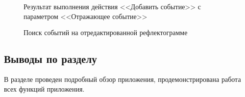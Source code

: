 \begin{figure}[H]
  \caption{Результат выполнения действия <<Добавить событие>> с параметром <<Отражающее событие>>}
  \label{ris:reflection_event_added}
\end{figure}

\begin{figure}[H]
  \caption{Поиск событий на отредактированной рефлектограмме}
  \label{ris:events_after_editing}
\end{figure}

\subsection{Выводы по разделу}

В разделе проведен подробный обзор приложения, продемонстрирована работа всех функций приложения.
